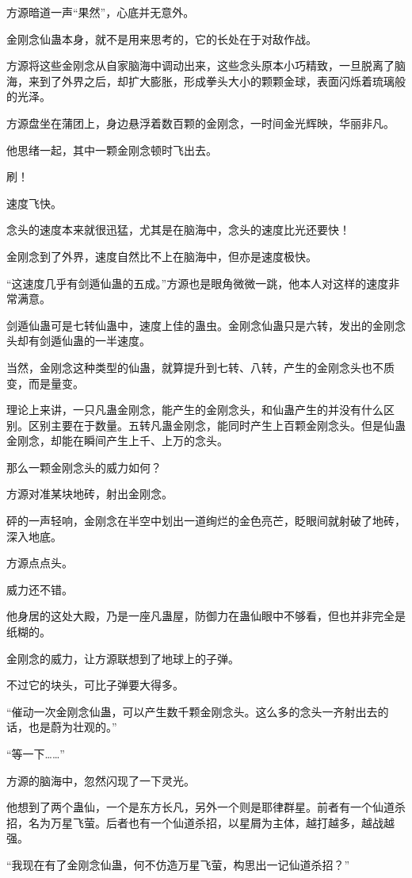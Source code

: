 \begin{this_body}
方源暗道一声“果然”，心底并无意外。

金刚念仙蛊本身，就不是用来思考的，它的长处在于对敌作战。

方源将这些金刚念从自家脑海中调动出来，这些念头原本小巧精致，一旦脱离了脑海，来到了外界之后，却扩大膨胀，形成拳头大小的颗颗金球，表面闪烁着琉璃般的光泽。

方源盘坐在蒲团上，身边悬浮着数百颗的金刚念，一时间金光辉映，华丽非凡。

他思绪一起，其中一颗金刚念顿时飞出去。

刷！

速度飞快。

念头的速度本来就很迅猛，尤其是在脑海中，念头的速度比光还要快！

金刚念到了外界，速度自然比不上在脑海中，但亦是速度极快。

“这速度几乎有剑遁仙蛊的五成。”方源也是眼角微微一跳，他本人对这样的速度非常满意。

剑遁仙蛊可是七转仙蛊中，速度上佳的蛊虫。金刚念仙蛊只是六转，发出的金刚念头却有剑遁仙蛊的一半速度。

当然，金刚念这种类型的仙蛊，就算提升到七转、八转，产生的金刚念头也不质变，而是量变。

理论上来讲，一只凡蛊金刚念，能产生的金刚念头，和仙蛊产生的并没有什么区别。区别主要在于数量。五转凡蛊金刚念，能同时产生上百颗金刚念头。但是仙蛊金刚念，却能在瞬间产生上千、上万的念头。

那么一颗金刚念头的威力如何？

方源对准某块地砖，射出金刚念。

砰的一声轻响，金刚念在半空中划出一道绚烂的金色亮芒，眨眼间就射破了地砖，深入地底。

方源点点头。

威力还不错。

他身居的这处大殿，乃是一座凡蛊屋，防御力在蛊仙眼中不够看，但也并非完全是纸糊的。

金刚念的威力，让方源联想到了地球上的子弹。

不过它的块头，可比子弹要大得多。

“催动一次金刚念仙蛊，可以产生数千颗金刚念头。这么多的念头一齐射出去的话，也是蔚为壮观的。”

“等一下……”

方源的脑海中，忽然闪现了一下灵光。

他想到了两个蛊仙，一个是东方长凡，另外一个则是耶律群星。前者有一个仙道杀招，名为万星飞萤。后者也有一个仙道杀招，以星屑为主体，越打越多，越战越强。

“我现在有了金刚念仙蛊，何不仿造万星飞萤，构思出一记仙道杀招？”


\end{this_body}
